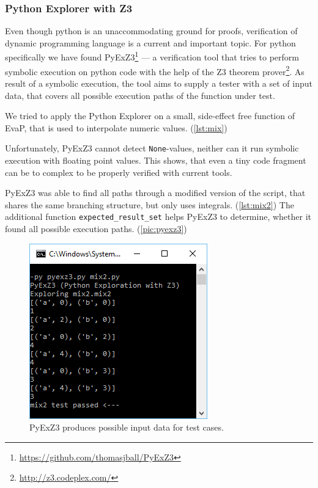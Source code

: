 \subsubsection{Python Explorer with Z3}

Even though python is an unaccommodating ground for proofs, verification of dynamic programming language is a current and important topic.
For python specifically we have found PyExZ3\footnote{\url{https://github.com/thomasjball/PyExZ3}} --- a verification tool that tries to perform symbolic execution on python code with the help of the Z3 theorem prover\footnote{\url{http://z3.codeplex.com/}}.
As result of a symbolic execution, the tool aims to supply a tester with a set of input data, that covers all possible execution paths of the function under test.

We tried to apply the Python Explorer on a small, side-effect free function of EvaP, that is used to interpolate numeric values. (\autoref{lst:mix})

Unfortunately, PyExZ3 cannot detect \texttt{None}-values, neither can it run symbolic execution with floating point values.
This shows, that even a tiny code fragment can be to complex to be properly verified with current tools.





PyExZ3 was able to find all paths through a modified version of the script, that shares the same branching structure, but only uses integrals. (\autoref{lst:mix2})
The additional function \texttt{expected\_result\_set} helps PyExZ3 to determine, whether it found all possible execution paths. (\autoref{pic:pyexz3})

\begin{figure}
	\centering
	\includegraphics{graphics/PyExZ3-mix2}
	\caption{PyExZ3 produces possible input data for test cases.}
	\label{pic:pyexz3}
\end{figure}
